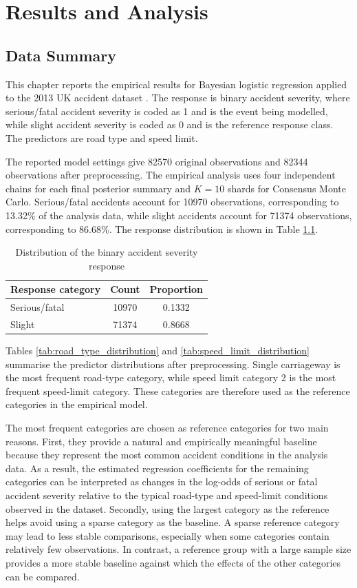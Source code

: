 \chapter{Results and Analysis}

\section{Data Summary}

This chapter reports the empirical results for Bayesian logistic regression applied to the 2013 UK accident dataset \cite{ukdataservice7550,dft2025quality}. The response is binary accident severity, where serious/fatal accident severity is coded as 1 and is the event being modelled, while slight accident severity is coded as 0 and is the reference response class. The predictors are road type and speed limit.

The reported model settings give 82570 original observations and 82344 observations after preprocessing. The empirical analysis uses four independent chains for each final posterior summary and $K=10$ shards for Consensus Monte Carlo. Serious/fatal accidents account for 10970 observations, corresponding to 13.32\% of the analysis data, while slight accidents account for 71374 observations, corresponding to 86.68\%. The response distribution is shown in Table \ref{tab:response_distribution}.

\begin{table}[htbp]
\centering
\caption{Distribution of the binary accident severity response}
\label{tab:response_distribution}
\begin{tabular}{lcc}
\hline
Response category & Count & Proportion \\
\hline
Serious/fatal & 10970 & 0.1332 \\
Slight & 71374 & 0.8668 \\
\hline
\end{tabular}
\end{table}

Tables \ref{tab:road_type_distribution} and \ref{tab:speed_limit_distribution} summarise the predictor distributions after preprocessing. Single carriageway is the most frequent road-type category, while speed limit category 2 is the most frequent speed-limit category. These categories are therefore used as the reference categories in the empirical model.

The most frequent categories are chosen as reference categories for two main reasons. First, they provide a natural and empirically meaningful baseline because they represent the most common accident conditions in the analysis data. As a result, the estimated regression coefficients for the remaining categories can be interpreted as changes in the log-odds of serious or fatal accident severity relative to the typical road-type and speed-limit conditions observed in the dataset. Secondly, using the largest category as the reference helps avoid using a sparse category as the baseline. A sparse reference category may lead to less stable comparisons, especially when some categories contain relatively few observations. In contrast, a reference group with a large sample size provides a more stable baseline against which the effects of the other categories can be compared.



